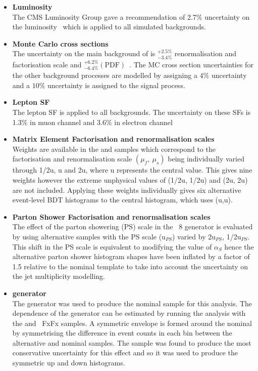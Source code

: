 \begin{itemize}
\item \textbf{Luminosity}\\
The CMS Luminosity Group gave a recommendation of 2.7$\%$ uncertainty on the luminosity~\cite{CMS-PAS-LUM-15-001} which is applied to all simulated backgrounds.
\item \textbf{Monte Carlo cross sections}\\
The uncertainty on the main background of \ttbar is ${}^{+2.5\%}_{-3.4\%}$ renormalisation and factorisation scale and ${}^{+6.2\%}_{-6.4\%} \left( \textrm{PDF} \right)$~\cite{PhysRevLett.110.252004}. The MC cross section uncertainties for the other background processes are modelled by assigning a $4\%$ uncertainty and a $10\%$ uncertainty is assigned to the signal process.
\item \textbf{Lepton SF}\\
The lepton SF is applied to all backgrounds. The uncertainty on these SFs is 1.3$\%$ in muon channel and 3.6$\%$ in electron channel
\item \textbf{Matrix Element Factorisation and renormalisation scales}\\
Weights are available in the \ttbar and \tttt samples which correspond to the factorisation and renormalisation scale $\left(\mu_{f},~\mu_{s}\right)$ being individually varied through 1/2u, u and 2u, where u represents the central value. This gives nine weights however the extreme unphysical values of (1/2u, 1/2u) and (2u, 2u) are not included. Applying these weights individually gives six alternative event-level BDT histograms to the central histogram, which uses (u,u). 
\item \textbf{Parton Shower Factorisation and renormalisation scales}\\
The effect of the parton showering (PS) scale in the \PYTHIA~8 generator is evaluated by using alternative \ttbar samples with the PS scale (u$_{PS}$) varied by 2u$_{PS}$, 1/2u$_{PS}$. This shift in the PS scale is equivalent to modifying the value of $\alpha_{S}$ hence the alternative parton shower histogram shapes have been inflated by a factor of 1.5 relative to the nominal template to take into account the uncertainty on the jet multiplicity modelling.
\item \textbf{\ttbar generator}\\
The \POWHEG generator was used to produce the nominal \ttbar sample for this analysis. The dependence of the generator can be estimated by running the analysis with the \MLM and \MADGRAPH\aMCATNLO~FxFx \ttbar samples. A symmetric envelope is formed around the nominal by symmetrising the difference in event counts in each bin between the alternative and nominal samples. The \MLM sample was found to produce the most conservative uncertainty for this effect and so it was used to produce the symmetric up and down histograms.

\end{itemize}
